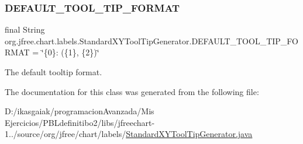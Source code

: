 \subsubsection{\texorpdfstring{D\+E\+F\+A\+U\+L\+T\+\_\+\+T\+O\+O\+L\+\_\+\+T\+I\+P\+\_\+\+F\+O\+R\+M\+AT}{DEFAULT\_TOOL\_TIP\_FORMAT}}
{\footnotesize\ttfamily final String org.\+jfree.\+chart.\+labels.\+Standard\+X\+Y\+Tool\+Tip\+Generator.\+D\+E\+F\+A\+U\+L\+T\+\_\+\+T\+O\+O\+L\+\_\+\+T\+I\+P\+\_\+\+F\+O\+R\+M\+AT = \char`\"{}\{0\}\+: (\{1\}, \{2\})\char`\"{}\hspace{0.3cm}{\ttfamily [static]}}

The default tooltip format. 

The documentation for this class was generated from the following file\+:\begin{DoxyCompactItemize}
\item 
D\+:/ikasgaiak/programacion\+Avanzada/\+Mis Ejercicios/\+P\+B\+Ldefinitibo2/libs/jfreechart-\/1../source/org/jfree/chart/labels/\mbox{\hyperlink{_standard_x_y_tool_tip_generator_8java}{Standard\+X\+Y\+Tool\+Tip\+Generator.\+java}}\end{DoxyCompactItemize}
